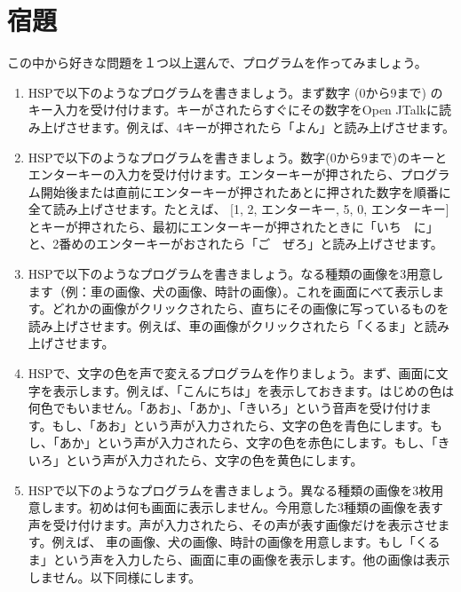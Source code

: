 \documentclass[text06.tex]{subfiles}
\begin{document}
\newpage
\section{宿題}
この中から好きな問題を１つ以上選んで、プログラムを作ってみましょう。
\begin{enumerate}
\item HSPで以下のようなプログラムを書きましょう。まず数字 (0から9まで) のキー入力を受け付けます。キーがされたらすぐにその数字をOpen JTalkに読み上げさせます。例えば、4キーが押されたら「よん」と読み上げさせます。
\item HSPで以下のようなプログラムを書きましょう。数字(0から9まで)のキーとエンターキーの入力を受け付けます。エンターキーが押されたら、プログラム開始後または直前にエンターキーが押されたあとに押された数字を順番に全て読み上げさせます。たとえば、 [1, 2, エンターキー, 5, 0, エンターキー]とキーが押されたら、最初にエンターキーが押されたときに「いち　に」と、2番めのエンターキーがおされたら「ご　ぜろ」と読み上げさせます。
\item HSPで以下のようなプログラムを書きましょう。なる種類の画像を3用意します（例：車の画像、犬の画像、時計の画像）。これを画面にべて表示します。どれかの画像がクリックされたら、直ちにその画像に写っているものを読み上げさせます。例えば、車の画像がクリックされたら「くるま」と読み上げさせます。
\item HSPで、文字の色を声で変えるプログラムを作りましょう。まず、画面に文字を表示します。例えば、「こんにちは」を表示しておきます。はじめの色は何色でもいません。「あお」、「あか」、「きいろ」という音声を受け付けます。もし、「あお」という声が入力されたら、文字の色を青色にします。もし、「あか」という声が入力されたら、文字の色を赤色にします。もし、「きいろ」という声が入力されたら、文字の色を黄色にします。
\item HSPで以下のようなプログラムを書きましょう。異なる種類の画像を3枚用意します。初めは何も画面に表示しません。今用意した3種類の画像を表す声を受け付けます。声が入力されたら、その声が表す画像だけを表示させます。例えば、 車の画像、犬の画像、時計の画像を用意します。もし「くるま」という声を入力したら、画面に車の画像を表示します。他の画像は表示しません。以下同様にします。
\end{enumerate}
\end{document}
